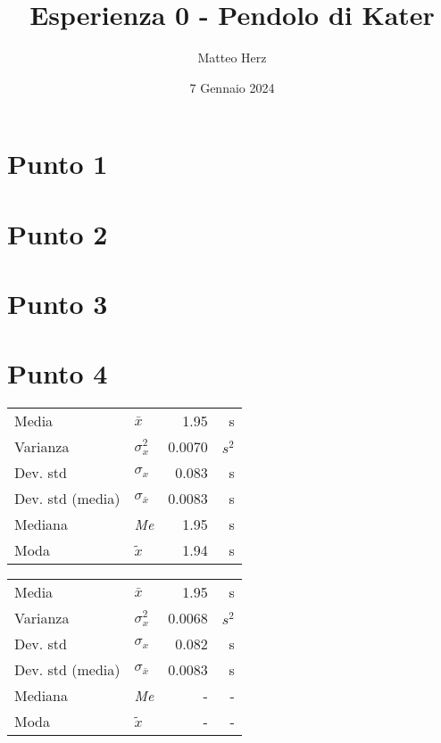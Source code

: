 \documentclass{article}
\title{Esperienza 0 - Pendolo di Kater}
\author{Matteo Herz}
\date{7 Gennaio 2024}
\begin{document}


\newpage

\tableofcontents 

\newpage 
\section{Punto 1}
\section{Punto 2}
\section{Punto 3}
\section{Punto 4}

\hspace{0.6cm}
    \begin{minipage}[c]{0.45\textwidth}
    	\centering 
        \begin{tabular}{llrr}
        	\toprule
            Media & $\bar{x}$ & 1.95 & s \\
            Varianza & $\sigma^2_x$ & 0.0070 & $s^2$ \\
            Dev. std & $\sigma_x$ & 0.083 & s \\
            Dev. std (media) & $\sigma_{\bar{x}}$ & 0.0083 & s \\
            Mediana & \textit{Me} & 1.95 & s \\
            Moda & $\tilde{x}$ & 1.94 & s \\
            \bottomrule 
        \end{tabular}
    \end{minipage}%
    \begin{minipage}[c]{0.45\textwidth}
    	\centering
        \begin{tabular}{llrr}
        	\toprule
            Media & $\bar{x}$ & 1.95 & s \\
            Varianza & $\sigma^2_x$ & 0.0068 & $s^2$ \\
            Dev. std & $\sigma_x$ & 0.082 & s \\
            Dev. std (media) & $\sigma_{\bar{x}}$ & 0.0083 & s \\
            Mediana & \textit{Me} & - & - \\
            Moda & $\tilde{x}$ & - & - \\
            \bottomrule
        \end{tabular}
    \end{minipage}
    \vspace{0.4cm}
\end{document}

